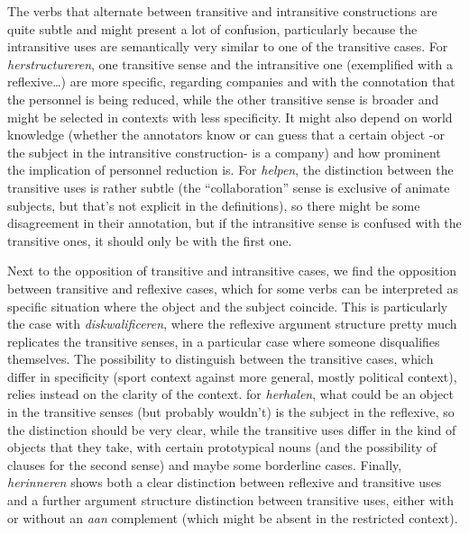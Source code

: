 \documentclass[
]{book}
\begin{document}
The verbs that alternate between transitive and intransitive constructions are quite subtle and might present a lot of confusion, particularly because the intransitive uses are semantically very similar to one of the transitive cases.
For \emph{herstructureren}, one transitive sense and the intransitive one (exemplified with a reflexive\ldots) are more specific, regarding companies and with the connotation that the personnel is being reduced, while the other transitive sense is broader and might be selected in contexts with less specificity. It might also depend on world knowledge (whether the annotators know or can guess that a certain object -or the subject in the intransitive construction- is a company) and how prominent the implication of personnel reduction is.
For \emph{helpen}, the distinction between the transitive uses is rather subtle (the ``collaboration'' sense is exclusive of animate subjects, but that's not explicit in the definitions), so there might be some disagreement in their annotation, but if the intransitive sense is confused with the transitive ones, it should only be with the first one.

Next to the opposition of transitive and intransitive cases, we find the opposition between transitive and reflexive cases, which for some verbs can be interpreted as specific situation where the object and the subject coincide.
This is particularly the case with \emph{diskwalificeren}, where the reflexive argument structure pretty much replicates the transitive senses, in a particular case where someone disqualifies themselves. The possibility to distinguish between the transitive cases, which differ in specificity (sport context against more general, mostly political context), relies instead on the clarity of the context.
for \emph{herhalen}, what could be an object in the transitive senses (but probably wouldn't) is the subject in the reflexive, so the distinction should be very clear, while the transitive uses differ in the kind of objects that they take, with certain prototypical nouns (and the possibility of clauses for the second sense) and maybe some borderline cases.
Finally, \emph{herinneren} shows both a clear distinction between reflexive and transitive uses and a further argument structure distinction between transitive uses, either with or without an \emph{aan} complement (which might be absent in the restricted context).
\end{document}
